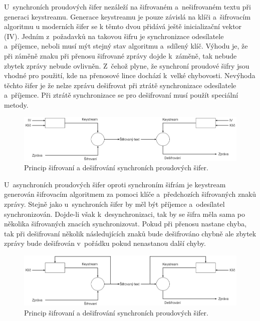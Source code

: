 U~synchroních proudových šifer nezáleží na šifrovaném a~nešifrovaném textu při generaci keystreamu. Generace keystreamu je pouze závislá na klíči a~šifrovacím algoritmu u moderních šifer se k těmto dvou přidává ještě inicializační vektor (IV).\cite{EncyclopediaSynchronous} Jedním z~požadavků na takovou šifru je synchronizace odesílatele a~příjemce, neboli musí mýt stejný stav algoritmu a~sdílený klíč. Výhodu je, že při záměně znaku při přenosu šifrované zprávy dojde k~záměně, tak nebude zbytek zprávy nebude ovlivněn. Z~čehož plyne, že synchroní proudové šifry jsou vhodné pro použití, kde na přenosové lince dochází k~velké chybovosti. Nevýhoda těchto šifer je že nelze zprávu dešifrovat při ztrátě synchronizace odesílatele a~příjemce. Při ztrátě synchronizace se pro dešifrovaní musí použít speciální metody. \cite{HavlicekBakalarka}
\begin{figure}[!h]
  \begin{center}
    \includegraphics[scale=0.3]{obrazky/synchronousCipher.png}
  \end{center}
  \caption[Synchroní proudová šifra]{Princip šifrovaní a dešifrování synchroních proudových šifer.\cite{EncyclopediaSynchronous}}
  \label{img:synchoronstream}
\end{figure}

U~asynchroních proudových šifer oproti synchroním šifrám je keystream generován šifrovacím algoritmem za pomoci klíče a~předchozích šifrovaných znaků zprávy. Stejně jako u~synchroních šifer by měl být příjemce a~odesílatel synchronizován. Dojde-li však k~desynchronizaci, tak by se šifra měla sama po několika šifrovaných znacích synchronizovat. Pokud při přenosu nastane chyba, tak při dešifrovaní několik následujících znaků bude dešifrováno chybně ale zbytek zprávy bude dešifrován v~pořádku pokud nenastanou další chyby.\cite{HavlicekBakalarka}
\begin{figure}[!h]
  \begin{center}
    \includegraphics[scale=0.3]{obrazky/asynchronousCipher.png}
  \end{center}
  \caption[Asynchroní proudová šifra]{Princip šifrovaní a dešifrování synchroních proudových šifer.\cite{EncyclopediaAsynchronous}}
  \label{img:asynchronstream}
\end{figure}

